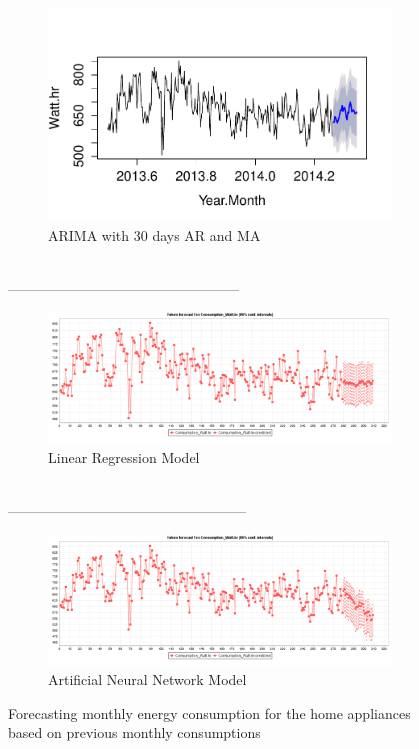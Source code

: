 \begin{figure}
        \centering
        \begin{subfigure}[b]{\textwidth}
                \includegraphics[width=\textwidth]{images/arima.pdf}
                \caption{ARIMA with 30 days AR and MA}
                \label{fig:arima}
        \end{subfigure}
        \\--------------------------------------------------
        
        
        \begin{subfigure}[b]{\textwidth}
                \includegraphics[width=\textwidth]{images/lr.pdf}
                \caption{Linear Regression Model}
                \label{fig:lr}
        \end{subfigure}
        \\---------------------------------------------------
        
        
        \begin{subfigure}[b]{\textwidth}
                \includegraphics[width=\textwidth]{images/ann.pdf}
                \caption{Artificial Neural Network Model}
                \label{fig:ann}
        \end{subfigure}
             \caption{Forecasting monthly energy consumption for the home appliances based on previous monthly consumptions}\label{fig:predicted}
\end{figure}

